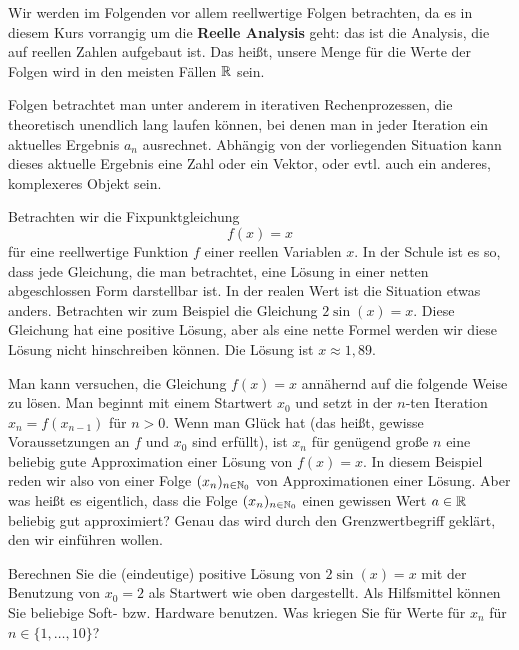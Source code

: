 \begin{bem}
	Wir werden im Folgenden vor allem reellwertige Folgen betrachten, da es in diesem Kurs vorrangig um die \textbf{Reelle Analysis} geht: das ist die Analysis, die auf reellen Zahlen aufgebaut ist.  Das heißt, unsere Menge für die Werte der Folgen wird in den meisten Fällen $\mathbb{R}$ sein. 
\end{bem} 

\begin{bem}
	Folgen betrachtet man unter anderem in iterativen Rechenprozessen, die theoretisch unendlich lang laufen können, bei denen man in jeder Iteration ein aktuelles Ergebnis $a_n$ ausrechnet. Abhängig von der vorliegenden Situation kann dieses aktuelle Ergebnis eine Zahl oder ein Vektor, oder evtl. auch ein anderes, komplexeres Objekt sein. 
\end{bem} 

\begin{bsp} Betrachten wir die Fixpunktgleichung 
	\[
		f(x) = x
	\] für eine reellwertige Funktion $f$ einer reellen Variablen $x$. In der Schule ist es so, dass jede Gleichung, die man betrachtet, eine Lösung in einer netten abgeschlossen Form darstellbar ist. In der realen Wert ist die Situation etwas anders. Betrachten wir zum Beispiel die Gleichung $2 \sin(x) = x$. Diese Gleichung hat eine positive Lösung, aber als eine nette Formel werden wir diese Lösung nicht hinschreiben können. Die Lösung ist $x \approx 1{,}89$. 
	
	Man kann versuchen, die Gleichung $f(x)=x$ annähernd auf die folgende Weise zu lösen. Man beginnt mit einem Startwert $x_0$ und setzt in der $n$-ten Iteration $x_n = f(x_{n-1})$ für $n > 0$. Wenn man Glück hat (das heißt, gewisse Voraussetzungen an $f$ und $x_0$ sind erfüllt), ist $x_n$ für genügend große $n$ eine beliebig gute Approximation einer Lösung von $f(x) =x$. In diesem Beispiel reden wir also von einer Folge $(x_n)_{ n \in \mathbb{N}_0}$ von Approximationen einer Lösung. Aber was heißt es eigentlich, dass die Folge $(x_n)_{n \in \mathbb{N}_0}$ einen gewissen Wert $a \in \mathbb{R}$ beliebig gut approximiert? Genau das wird durch den Grenzwertbegriff geklärt, den wir einführen wollen. 
\end{bsp} 


\begin{aufg} 
		Berechnen Sie die (eindeutige) positive  Lösung von $2 \sin(x) = x$ mit der Benutzung von $x_0 = 2$ als Startwert wie oben dargestellt. Als Hilfsmittel können Sie beliebige Soft- bzw. Hardware benutzen. Was kriegen Sie für Werte für $x_n$ für $n \in \{1,\ldots,10\}$? 
\end{aufg} 

